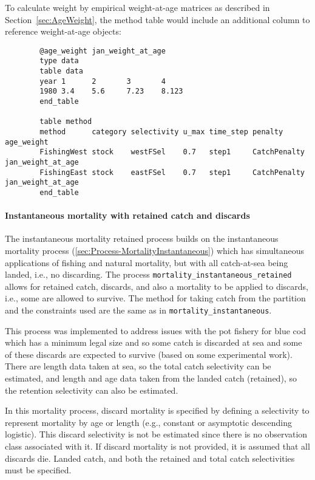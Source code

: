To calculate weight by empirical weight-at-age matrices as described in Section~\ref{sec:AgeWeight}, the method table would include an additional column to reference weight-at-age objects:

{\small{\begin{verbatim}
		@age_weight jan_weight_at_age
		type data
		table data
		year 1 		2 		3 		4
		1980 3.4	5.6		7.23 	8.123
		end_table

		table method
		method      category selectivity u_max time_step penalty      age_weight
		FishingWest stock    westFSel    0.7   step1     CatchPenalty jan_weight_at_age
		FishingEast stock    eastFSel    0.7   step1     CatchPenalty jan_weight_at_age
		end_table
\end{verbatim}}}

\paragraph{Instantaneous mortality with retained catch and discards}\label{sec:Process-MortalityInstantaneousRetained}

The instantaneous mortality retained process builds on the instantaneous mortality process (\ref{sec:Process-MortalityInstantaneous}) which has simultaneous applications of fishing and natural mortality, but with all catch-at-sea being landed, i.e., no discarding. The process \texttt{mortality\_instantaneous\_retained} allows for retained catch, discards, and also a mortality to be applied to discards, i.e., some are allowed to survive. The method for taking catch from the partition and the constraints used are the same as in \texttt{mortality\_instantaneous}.

This process was implemented to address issues with the pot fishery for blue cod which has a minimum legal size and so some catch is discarded at sea and some of these discards are expected to survive (based on some experimental work). There are length data taken at sea, so the total catch selectivity can be estimated, and length and age data taken from the landed catch (retained), so the retention selectivity can also be estimated.

In this mortality process, discard mortality is specified by defining a selectivity to represent mortality by age or length (e.g., constant or asymptotic descending logistic).  This discard selectivity is not be estimated since there is no observation class associated with it. If discard mortality is not provided, it is assumed that all discards die. Landed catch, and both the retained and total catch selectivities must be specified.

